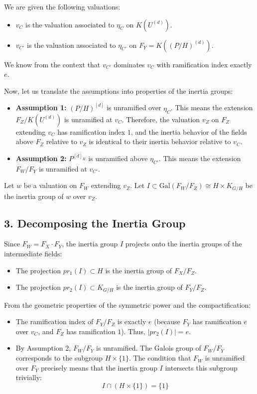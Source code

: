 We are given the following valuations:
\begin{itemize}
    \item $v_C$ is the valuation associated to $\eta_C$ on $K(U^{(d)})$.
    \item $v_{C'}$ is the valuation associated to $\eta_{C'}$ on $F_Y = K((P/H)^{(d)})$.
\end{itemize}
We know from the context that $v_{C'}$ dominates $v_C$ with ramification index exactly $e$.

Now, let us translate the assumptions into properties of the inertia groups:
\begin{itemize}
    \item \textbf{Assumption 1:} $(P/H)^{[d]}$ is unramified over $\eta_C$.
    This means the extension $F_Z / K(U^{(d)})$ is unramified at $v_C$. Therefore, the valuation $v_Z$ on $F_Z$ extending $v_C$ has ramification index $1$, and the inertia behavior of the fields above $F_Z$ relative to $v_Z$ is identical to their inertia behavior relative to $v_C$.
    
    \item \textbf{Assumption 2:} $P^{[d]_H}$ is unramified above $\eta_{C'}$.
    This means the extension $F_W / F_Y$ is unramified at $v_{C'}$.
\end{itemize}

Let $w$ be a valuation on $F_W$ extending $v_Z$. Let $I \subset \text{Gal}(F_W / F_Z) \cong H \times K_{G/H}$ be the inertia group of $w$ over $v_Z$.

\subsection*{3. Decomposing the Inertia Group}

Since $F_W = F_X \cdot F_Y$, the inertia group $I$ projects onto the inertia groups of the intermediate fields:
\begin{itemize}
    \item The projection $pr_1(I) \subset H$ is the inertia group of $F_X / F_Z$.
    \item The projection $pr_2(I) \subset K_{G/H}$ is the inertia group of $F_Y / F_Z$.
\end{itemize}

From the geometric properties of the symmetric power and the compactification:
\begin{itemize}
    \item The ramification index of $F_Y / F_Z$ is exactly $e$ (because $F_Y$ has ramification $e$ over $v_C$, and $F_Z$ has ramification $1$). Thus, $|pr_2(I)| = e$.
    \item By Assumption 2, $F_W / F_Y$ is unramified. The Galois group of $F_W / F_Y$ corresponds to the subgroup $H \times \{1\}$. The condition that $F_W$ is unramified over $F_Y$ precisely means that the inertia group $I$ intersects this subgroup trivially:
    $$I \cap (H \times \{1\}) = \{1\}$$
\end{itemize}

